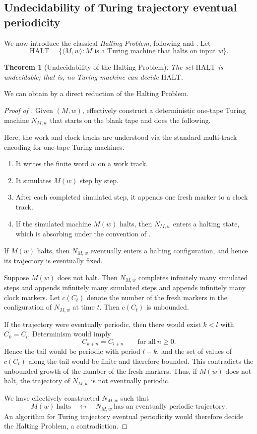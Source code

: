 \documentclass{amsart}
\newtheorem{theorem}{Theorem}[section]
\theoremstyle{definition}
\theoremstyle{remark}
\numberwithin{equation}{section}
\begin{document}
\subsection{Undecidability of Turing trajectory eventual periodicity}\label{sec:uttep}
We now introduce the classical \emph{Halting Problem}, following \cite{Sipser2012} and \cite{hamkins2024turing}.
Let
\[
\mathrm{HALT}=\{ \langle M, w \rangle : M \text{ is a Turing machine that halts on input } w \}.
\]

\begin{theorem}[Undecidability of the Halting Problem]
	The set $\mathrm{HALT}$ is undecidable; that is, no Turing machine can decide $\mathrm{HALT}$.
\end{theorem}
We can obtain  by a direct reduction of the Halting Problem.
\begin{proof}[Proof of ]
Given $(M,w)$, effectively construct a deterministic one-tape Turing machine $N_{M,w}$ that starts on the blank tape and does the following.

Here, the work and clock tracks are understood via the standard multi-track encoding for one-tape Turing machines.
\begin{enumerate}[label=(\alph*)]
\item It writes the finite word $w$ on a work track.
\item It simulates $M(w)$ step by step.
\item After each completed simulated step, it appends one fresh marker to a clock track.
\item If the simulated machine $M(w)$ halts, then $N_{M,w}$ enters a halting state, which is absorbing under the convention of .
\end{enumerate}

If $M(w)$ halts, then $N_{M,w}$ eventually enters a halting configuration, and hence its trajectory is eventually fixed.

Suppose $M(w)$ does not halt.
Then $N_{M,w}$ completes infinitely many simulated steps and appends infinitely many simulated steps and appends infinitely many clock markers.
Let $c(C_t)$ denote the number of the fresh markers in the configuration of $N_{M,w}$ at time $t$.
Then $c(C_t)$ is unbounded.

If the trajectory were eventually periodic, then there would exist $k<l$ with $C_k=C_l$.
Determinism would imply
\[C_{k+n}=C_{l+n}\qquad \textrm{for all}\ n\ge0.\]
Hence the tail would be periodic with period $l-k$, and the set of values of $c(C_t)$ along the tail would be finite and therefore bounded.
This contradicts the unbounded growth of the number of the fresh markers.
Thus, if $M(w)$ does not halt, the trajectory of $N_{M,w}$ is not eventually periodic.

We have effectively constructed $N_{M,w}$ such that
\[M(w)\ \text{halts}\quad\longleftrightarrow\quad N_{M,w}\ \text{has an eventually periodic trajectory.}\]
An algorithm for Turing trajectory eventual periodicity would therefore decide the Halting Problem, a contradiction.
\end{proof}
\end{document}

